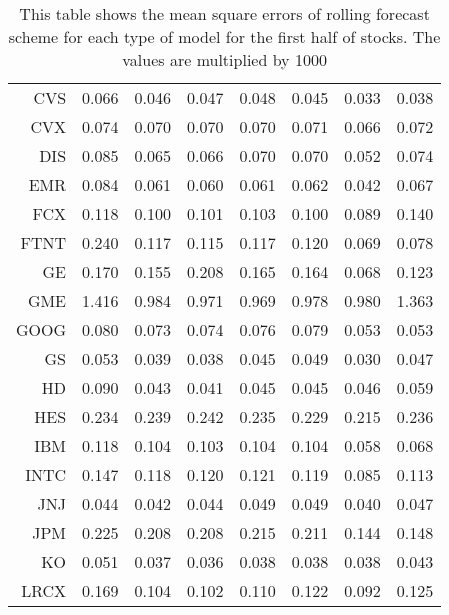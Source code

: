 \begin{table}[ht]
\begin{tabular}{rrrrrrrr}
  CVS & 0.066 & 0.046 & 0.047 & 0.048 & 0.045 & 0.033 & 0.038 \\ 
  CVX & 0.074 & 0.070 & 0.070 & 0.070 & 0.071 & 0.066 & 0.072 \\ 
  DIS & 0.085 & 0.065 & 0.066 & 0.070 & 0.070 & 0.052 & 0.074 \\ 
  EMR & 0.084 & 0.061 & 0.060 & 0.061 & 0.062 & 0.042 & 0.067 \\ 
  FCX & 0.118 & 0.100 & 0.101 & 0.103 & 0.100 & 0.089 & 0.140 \\ 
  FTNT & 0.240 & 0.117 & 0.115 & 0.117 & 0.120 & 0.069 & 0.078 \\ 
  GE & 0.170 & 0.155 & 0.208 & 0.165 & 0.164 & 0.068 & 0.123 \\ 
  GME & 1.416 & 0.984 & 0.971 & 0.969 & 0.978 & 0.980 & 1.363 \\ 
  GOOG & 0.080 & 0.073 & 0.074 & 0.076 & 0.079 & 0.053 & 0.053 \\ 
  GS & 0.053 & 0.039 & 0.038 & 0.045 & 0.049 & 0.030 & 0.047 \\ 
  HD & 0.090 & 0.043 & 0.041 & 0.045 & 0.045 & 0.046 & 0.059 \\ 
  HES & 0.234 & 0.239 & 0.242 & 0.235 & 0.229 & 0.215 & 0.236 \\ 
  IBM & 0.118 & 0.104 & 0.103 & 0.104 & 0.104 & 0.058 & 0.068 \\ 
  INTC & 0.147 & 0.118 & 0.120 & 0.121 & 0.119 & 0.085 & 0.113 \\ 
  JNJ & 0.044 & 0.042 & 0.044 & 0.049 & 0.049 & 0.040 & 0.047 \\ 
  JPM & 0.225 & 0.208 & 0.208 & 0.215 & 0.211 & 0.144 & 0.148 \\ 
  KO & 0.051 & 0.037 & 0.036 & 0.038 & 0.038 & 0.038 & 0.043 \\ 
  LRCX & 0.169 & 0.104 & 0.102 & 0.110 & 0.122 & 0.092 & 0.125 \\ 
   \hline
\end{tabular}
\caption[MSE rolling forecast (1)]{This table shows the mean square errors of rolling forecast scheme for each type of model for the first half of stocks. 
                     The values are multiplied by 1000} 
\label{Table:MSE_r_1}
\end{table}
